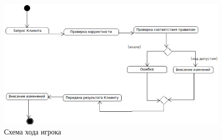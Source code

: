 \begin{figure}[ht]
\centering
\includegraphics[width=15cm]{images/activitygen.png}
\caption{Схема хода игрока}
\label{fig}
\end{figure}

\newpage
\endinput
